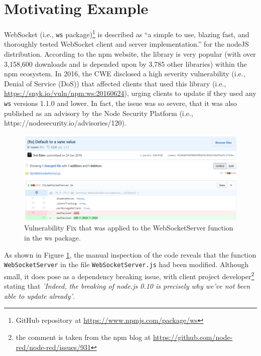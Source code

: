 \section{Motivating Example}



WebSocket (i.e., \texttt{ws} package)\footnote{GitHub repository at \url{https://www.npmjs.com/package/ws}} is described as ``a simple to use, blazing fast, and thoroughly tested WebSocket client and server implementation.'' for the nodeJS distribution.
According to the npm website, the library is very popular (with over 3,158,600 downloads and is  depended upon by 3,785 other libraries) within the npm ecosystem.
In 2016, the CWE disclosed a high severity vulnerability (i.e., Denial of Service (DoS)) that affected clients that used this library (i.e.,  \url{https://snyk.io/vuln/npm:ws:20160624}), urging clients to update if they used any \texttt{ws} versions 1.1.0 and lower.
In fact, the issue was so severe, that it was also published as an advisory by the Node Security Platform (i.e., https://nodesecurity.io/advisories/120).

\begin{figure}[th]
\centering
\includegraphics[width=1\textwidth]{images/codeWS.PNG}
\caption{Vulnerability Fix that was applied to the WebSocketServer function in the ws package.}
\label{fig:codeWS}
   \end{figure}

As shown in Figure \ref{fig:codeWS}, the manual inspection of the code reveals that the function \texttt{WebSocketServer} in the file \texttt{WebSocketServer.js} had been modified.
Although small, it does pose as a dependency breaking issue, with client project developer\footnote{the comment is taken from the npm blog at \url{https://github.com/node-red/node-red/issues/931}} stating that \textit{'Indeed, the breaking of node.js 0.10 is precisely why we've not been able to update already'}. 

